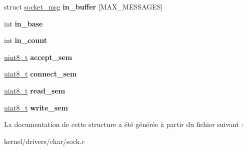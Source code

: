 \begin{DoxyCompactItemize}
\item 
\hypertarget{structsocket_a9ee09df65b7ec6bccd58fe2d4eebe6d9}{struct \hyperlink{structsocket__msg}{socket\+\_\+msg} {\bfseries in\+\_\+buffer} \mbox{[}M\+A\+X\+\_\+\+M\+E\+S\+S\+A\+G\+E\+S\mbox{]}}\label{structsocket_a9ee09df65b7ec6bccd58fe2d4eebe6d9}

\item 
\hypertarget{structsocket_ad1f8d42ded9f1e8a017780fa5bde11a0}{int {\bfseries in\+\_\+base}}\label{structsocket_ad1f8d42ded9f1e8a017780fa5bde11a0}

\item 
\hypertarget{structsocket_a3f3e2a3210219cad6bf97effcb29c074}{int {\bfseries in\+\_\+count}}\label{structsocket_a3f3e2a3210219cad6bf97effcb29c074}

\item 
\hypertarget{structsocket_ad7b80474cddbbbe5b8ca6a88c3790519}{\hyperlink{kernel_2include_2types_8h_aba7bc1797add20fe3efdf37ced1182c5}{uint8\+\_\+t} {\bfseries accept\+\_\+sem}}\label{structsocket_ad7b80474cddbbbe5b8ca6a88c3790519}

\item 
\hypertarget{structsocket_a2892cf67b33e9b8fc0cfd3094ad3d3fd}{\hyperlink{kernel_2include_2types_8h_aba7bc1797add20fe3efdf37ced1182c5}{uint8\+\_\+t} {\bfseries connect\+\_\+sem}}\label{structsocket_a2892cf67b33e9b8fc0cfd3094ad3d3fd}

\item 
\hypertarget{structsocket_acff0fb866f8282e667e1ee6ecc3ea355}{\hyperlink{kernel_2include_2types_8h_aba7bc1797add20fe3efdf37ced1182c5}{uint8\+\_\+t} {\bfseries read\+\_\+sem}}\label{structsocket_acff0fb866f8282e667e1ee6ecc3ea355}

\item 
\hypertarget{structsocket_a6dcd09bbe72cd9781a3d3bfff9dda45b}{\hyperlink{kernel_2include_2types_8h_aba7bc1797add20fe3efdf37ced1182c5}{uint8\+\_\+t} {\bfseries write\+\_\+sem}}\label{structsocket_a6dcd09bbe72cd9781a3d3bfff9dda45b}

\end{DoxyCompactItemize}


La documentation de cette structure a été générée à partir du fichier suivant \+:\begin{DoxyCompactItemize}
\item 
kernel/drivers/char/sock.\+c\end{DoxyCompactItemize}
